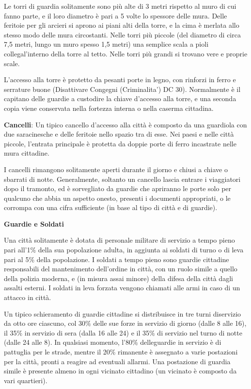 \documentclass[a4paper,11pt,twoside,openany]{book}
\begin{document}
Le torri di guardia solitamente sono più alte di 3 metri rispetto al muro di cui fanno parte, e il loro diametro è pari a 5 volte lo spessore delle mura. Delle feritoie per gli arcieri si aprono ai piani alti della torre, e la cima è merlata allo stesso modo delle mura circostanti. Nelle torri più piccole (del diametro di circa 7,5 metri, lungo un muro spesso 1,5 metri) una semplice scala a pioli collegal'interno della torre al tetto. Nelle torri più grandi si trovano vere e proprie scale.

L'accesso alla torre è protetto da pesanti porte in legno, con rinforzi in ferro e serrature buone (Disattivare Congegni (Criminalita') DC 30). Normalmente è il capitano delle guardie a custodire la chiave d'accesso alla torre, e una seconda copia viene conservata nella fortezza interna o nella caserma cittadina.

\textbf{Cancelli}: Un tipico cancello d'accesso alla città è composto da una guardiola con due saracinesche e delle feritoie nello spazio tra di esse. Nei paesi e nelle città piccole, l'entrata principale è protetta da doppie porte di ferro incastrate nelle mura cittadine.

I cancelli rimangono solitamente aperti durante il giorno e chiusi a chiave o sbarrati di notte. Generalmente, soltanto un cancello lascia entrare i viaggiatori dopo il tramonto, ed è sorvegliato da guardie che apriranno le porte solo per qualcuno che abbia un aspetto onesto, presenti i documenti appropriati, o le corrompa con una cifra sufficiente (in base al tipo di città e di guardie).

\textbf{Guardie e Soldati}

Una città solitamente è dotata di personale militare di servizio a tempo pieno pari all'1\% della sua popolazione adulta, in aggiunta ai soldati di turno o di leva pari al 5\% della popolazione. I soldati a tempo pieno sono guardie cittadine responsabili del mantenimento dell'ordine in città, con un ruolo simile a quello della polizia moderna, e (in misura assai minore) della difesa della città dagli assalti esterni. I soldati in leva forzata vengono chiamati alle armi in caso di un attacco in città.

Un tipico schieramento di guardie cittadine si distribuisce in tre turni diservizio da otto ore ciascuno, col 30\% delle sue forze in servizio di giorno (dalle 8 alle 16), il 35\% in servizio di sera (dalla 16 alle 24) e il 35\% di servizio nel turno di notte (dalle 24 alle 8). In qualsiasi momento, l'80\% delleguardie in servizio è di pattuglia per le strade, mentre il 20\% rimanente è assegnato a varie postazioni per la città, pronti a reagire ad eventuali allarmi. Una postazione di guardia simile è presente almeno in ogni vicinato cittadino (un vicinato è composto da vari quartieri).
\end{document}
